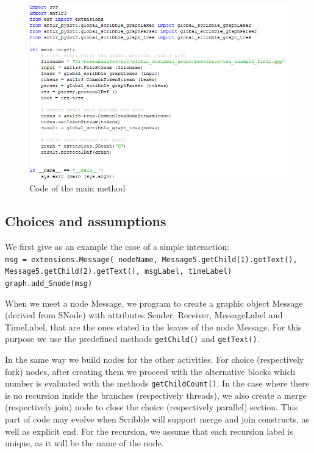 \documentclass[a4paper,11pt,twoside]{report}
\begin{document}
\begin{figure}[h]
\begin{center}
\includegraphics[scale=0.72]{mainmethod}
\end{center}
\caption{Code of the main method}
\label{fig:mainmethod}
\end{figure}


\subsection{Choices and assumptions}
We first give as an example the case of a simple interaction: \\
\texttt{msg = extensions.Message( nodeName, Message5.getChild(1).getText(), \\ Message5.getChild(2).getText(), msgLabel, timeLabel)\\
graph.add\_Snode(msg)}

When we meet a node Message, we program to create a graphic object Message (derived from SNode) with attributes Sender, Receiver, MessageLabel and TimeLabel, that are the ones stated in the leaves of the node Message. For this purpose we use the predefined methods \texttt{getChild()} and \texttt{getText()}.

In the same way we build nodes for the other activities. For choice (respectively fork) nodes, after creating them we proceed with the alternative blocks which number is evaluated with the methods \texttt{getChildCount()}. In the case where there is no recursion inside the branches (respectively threads), we also create a merge (respectively join) node to close the choice (respectively parallel) section. This part of code may evolve when Scribble will support merge and join constructs, as well as explicit end. For the recursion, we assume that each recursion label is unique, as it will be the name of the node.
\end{document}
